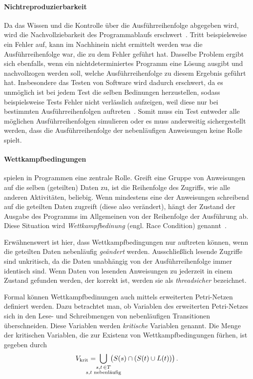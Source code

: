 \paragraph{Nichtreproduzierbarkeit}
Da das Wissen und die Kontrolle über die Ausführreihenfolge abgegeben wird, wird die Nachvollziebarkeit des Programmablaufs erschwert~\cite[S.~20]{Herrtwich1989}. Tritt beispielsweise ein Fehler auf, kann im Nachhinein nicht ermittelt werden was die Ausführreihenfolge war, die zu dem Fehler geführt hat. Dasselbe Problem ergibt sich ebenfalls, wenn ein nichtdeterminiertes Programm eine Lösung ausgibt und nachvollzogen werden soll, welche Ausführreihenfolge zu diesem Ergebnis geführt hat. Insbesondere das Testen von Software wird dadurch erschwert, da es unmöglich ist bei jedem Test die selben Bedinungen herzustellen, sodass beispielsweise Tests Fehler nicht verlässlich aufzeigen, weil diese nur bei bestimmten Ausführreihenfolgen auftreten~\cite[S.~20]{Herrtwich1989}. Somit muss ein Test entweder alle möglichen Ausführreihenfolgen simulieren oder es muss anderweitig sichergestellt werden, dass die Ausführreihenfolge der nebenläufigen Anweisungen keine Rolle spielt.
\paragraph{Wettkampfbedingungen}
 spielen in Programmen eine zentrale Rolle. Greift eine Gruppe von Anweisungen auf die selben (geteilten) Daten zu, ist die Reihenfolge des Zugriffs, wie alle anderen Aktivitäten, beliebig. Wenn mindestens eine der Anweisungen schreibend auf die geteilten Daten zugreift (diese also verändert), hängt der Zustand der Ausgabe des Programms im Allgemeinen von der Reihenfolge der Ausführung ab. Diese Situation wird \emph{Wettkampfbedinung} (engl. Race Condition) genannt~\cite{Hettel2016}. 

Erwähnenswert ist hier, dass Wettkampfbedingungen nur auftreten können, wenn die geteilten Daten nebenläufig \emph{geändert} werden. Ausschließlich lesende Zugriffe sind unkritisch, da die Daten unabhängig von der Ausführreihenfolge immer identisch sind. Wenn Daten von lesenden Anweisungen zu jederzeit in einem Zustand gefunden werden, der korrekt ist, werden sie als \emph{threadsicher} bezeichnet.

Formal können Wettkampfbedinungen auch mittels erweiterten Petri-Netzen definiert werden. Dazu betrachtet man, ob Variablen des erweiterten Petri-Netzes sich in den Lese- und Schreibmengen von nebenläufigen Transitionen überschneiden. Diese Variablen werden \emph{kritische} Variablen genannt. Die Menge der kritischen Variablen, die zur Existenz von Wettkampfbedingungen fürhen, ist gegeben durch
\begin{align*}
	V_\text{krit} = \;\bigcup_{\mathclap{\substack{s,t\, \in T\\s, t \text{ nebenläufig}}}} \;\left( \strut{S(s) \cap (S(t) \cup L(t))}\right).
\end{align*}

